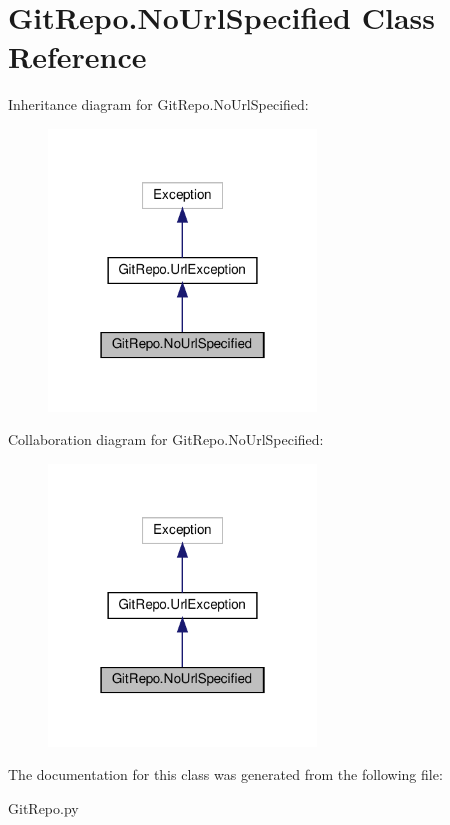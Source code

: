 \hypertarget{class_git_repo_1_1_no_url_specified}{}\section{Git\+Repo.\+No\+Url\+Specified Class Reference}
\label{class_git_repo_1_1_no_url_specified}


Inheritance diagram for Git\+Repo.\+No\+Url\+Specified\+:\nopagebreak
\begin{figure}[H]
\begin{center}
\leavevmode
\includegraphics[width=202pt]{class_git_repo_1_1_no_url_specified__inherit__graph}
\end{center}
\end{figure}


Collaboration diagram for Git\+Repo.\+No\+Url\+Specified\+:\nopagebreak
\begin{figure}[H]
\begin{center}
\leavevmode
\includegraphics[width=202pt]{class_git_repo_1_1_no_url_specified__coll__graph}
\end{center}
\end{figure}


The documentation for this class was generated from the following file\+:\begin{DoxyCompactItemize}
\item 
Git\+Repo.\+py\end{DoxyCompactItemize}

